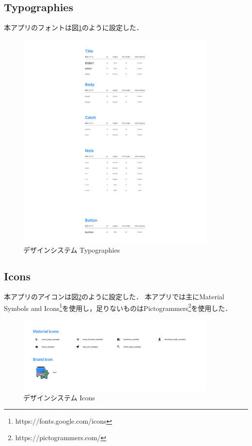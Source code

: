 \subsection{Typographies}
    本アプリのフォントは図\ref{fig:typographies}のように設定した．
    \pagebreak
    \begin{figure}
        \centering
        \includegraphics[width=10cm]{images/typographies.png}
        \caption{デザインシステム Typographies}
        \label{fig:typographies}
    \end{figure}
\subsection{Icons}
    本アプリのアイコンは図\ref{fig:icons}のように設定した．
    本アプリでは主にMaterial Symbols and Icons\footnote{https://fonts.google.com/icons}を使用し，足りないものはPictogrammers\footnote{https://pictogrammers.com/}を使用した．
        \pagebreak
        \begin{figure}
            \centering
            \includegraphics[width=10cm]{images/icons.png}
            \caption{デザインシステム Icons}
            \label{fig:icons}
        \end{figure}
